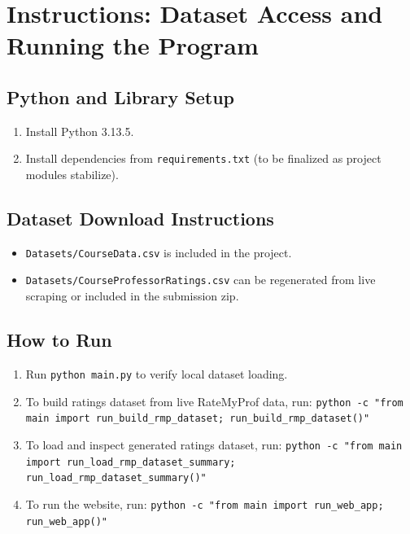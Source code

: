 \documentclass[12pt]{article}
\begin{document}
\section{Instructions: Dataset Access and Running the Program}
\subsection{Python and Library Setup}
\begin{enumerate}[leftmargin=*]
    \item Install Python 3.13.5.
    \item Install dependencies from \texttt{requirements.txt} (to be finalized as project modules stabilize).
\end{enumerate}

\subsection{Dataset Download Instructions}
\begin{itemize}[leftmargin=*]
    \item \texttt{Datasets/CourseData.csv} is included in the project.
    \item \texttt{Datasets/CourseProfessorRatings.csv} can be regenerated from live scraping or included in the submission zip.
\end{itemize}

\subsection{How to Run}
\begin{enumerate}[leftmargin=*]
    \item Run \texttt{python main.py} to verify local dataset loading.
    \item To build ratings dataset from live RateMyProf data, run:
    \texttt{python -c "from main import run\_build\_rmp\_dataset; run\_build\_rmp\_dataset()"}
    \item To load and inspect generated ratings dataset, run:
    \texttt{python -c "from main import run\_load\_rmp\_dataset\_summary; run\_load\_rmp\_dataset\_summary()"}
    \item To run the website, run:
    \texttt{python -c "from main import run\_web\_app; run\_web\_app()"}
\end{enumerate}
\end{document}
